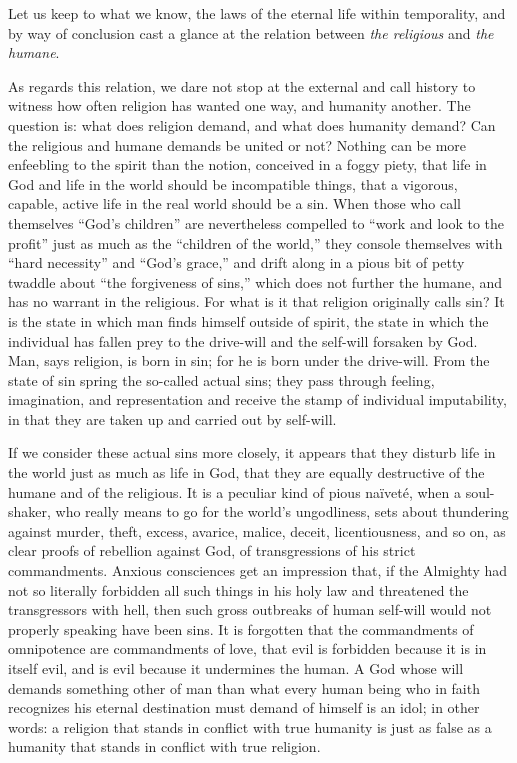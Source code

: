 \documentclass[12pt,a4paper,openany]{book}
\newcommand{\opage}[1]{\marginnote{\footnotesize\textit{[#1]}}}
\begin{document}
Let us keep to what we know, the laws of the eternal life
within temporality, and by way of conclusion cast a glance
at the relation between \emph{the religious} and \emph{the humane}.

As regards this relation, we dare not
stop at the external and call history to witness
how often religion has wanted one way, and humanity
another. The question is: what does religion demand,
and what does humanity demand? Can the religious and humane
demands be united or not? Nothing can be more
enfeebling to the spirit than the notion, conceived in a foggy piety,
that life in God and life in the world should be
incompatible things, that a vigorous, capable, active life in the
real world should be a sin. When those who
call themselves ``God's children'' are nevertheless compelled to
``work and look to the profit'' just as much as the ``children
of the world,'' they console themselves with ``hard necessity''
and ``God's grace,'' and drift along in a pious bit of petty twaddle about
``the forgiveness of sins,'' which does not further the humane, and
has no warrant in the religious. For what is it
that religion originally calls sin? It is the state
in which man finds himself outside of spirit, the
state in which the individual has fallen prey to the drive-will and
the self-will forsaken by God. Man, says religion,
is born in sin; for he is born under the drive-will. From
the state of sin spring the so-called actual sins;
they pass through feeling, imagination, and representation and receive
the stamp of individual imputability, in that they are taken up
and carried out by self-will.

If we consider these actual sins more closely, it
appears that they disturb life in the world just as much as life
in God, that they are equally destructive of the humane and
of the religious. It is a peculiar kind of pious naïveté,
\setcounter{footnote}{0}%
\opage{72}when a soul-shaker, who really means to go for the world's
ungodliness, sets about thundering against murder, theft,
excess, avarice, malice, deceit, licentiousness,
and so on, as clear proofs of rebellion against God, of transgressions
of his strict commandments. Anxious consciences get
an impression that, if the Almighty had not so literally
forbidden all such things in his holy law and threatened
the transgressors with hell, then such gross outbreaks
of human self-will would not properly speaking have been
sins. It is forgotten that the commandments of omnipotence are commandments of love,
that evil is forbidden because it is in itself evil,
and is evil because it undermines the human. A
God whose will demands something other of man than
what every human being who in faith recognizes his eternal
destination must demand of himself is an idol; in
other words: a religion that stands in conflict with true
humanity is just as false as a humanity that stands
in conflict with true religion.
\end{document}
